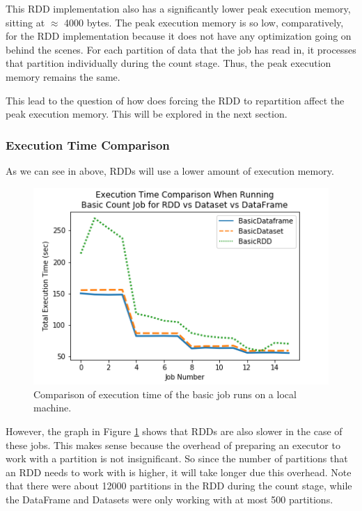 \documentclass[conference]{IEEEtran}
\begin{document}
This RDD implementation also has a significantly lower peak execution memory, sitting at $\approx$ 4000 bytes.
The peak execution memory is so low, comparatively, for the RDD implementation because it does not have any optimization going on behind the scenes.
For each partition of data that the job has read in, it processes that partition individually during the count stage.
Thus, the peak execution memory remains the same.

This lead to the question of how does forcing the RDD to repartition affect the peak execution memory.
This will be explored in the next section.

\subsubsection{Execution Time Comparison}
As we can see in above, RDDs will use a lower amount of execution memory.
\begin{figure}
    \includegraphics[width=\linewidth]{../python_scripts/images/basicJobAllExecutionTime.png}
    \caption{Comparison of execution time of the basic job runs on a local machine.}
    \label{fig:basicJobAllExecutionTime}
\end{figure}

However, the graph in Figure \ref{fig:basicJobAllExecutionTime} shows that RDDs are also slower in the case of these jobs.
This makes sense because the overhead of preparing an executor to work with a partition is not insignificant.
So since the number of partitions that an RDD needs to work with is higher, it will take longer due this overhead.
Note that there were about 12000 partitions in the RDD during the count stage, while the DataFrame and Datasets were only working with at most 500 partitions.
\end{document}
